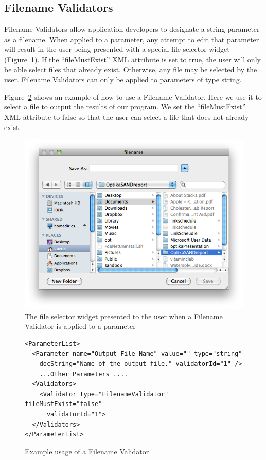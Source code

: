 \subsection{Filename Validators}
Filename Validators allow application developers to designate a string parameter as a filename. When applied to a parameter,
any attempt to edit that parameter will result in the user being presented with a special file selector widget (Figure~\ref{fileSelectorWidget}). If the 
``fileMustExist'' XML attribute is set to true, the user will only be able select files that already exist. Otherwise, any file may be selected by the user.
Filename Validators can only be applied to parameters of type string. 

Figure~\ref{filenameValidatorXML} shows an example of how to use a Filename Validator. Here we use it to select a file to output the results
of our program. We set the ``fileMustExist'' XML attribute to false so that the user can select a file that does not already exist.
\begin{figure}
\centering
\includegraphics[scale=0.5]{graphics/fileWidget}
\caption{The file selector widget presented to the user when a Filename Validator is applied to a parameter}
\label{fileSelectorWidget}
\end{figure}

\begin{figure}
\centering
{\footnotesize
\begin{Verbatim}
<ParameterList>
  <Parameter name="Output File Name" value="" type="string" 
    docString="Name of the output file." validatorId="1" />
    ...Other Parameters ....
  <Validators>
    <Validator type="FilenameValidator" fileMustExist="false" 
      validatorId="1">
  </Validators>
</ParameterList>
\end{Verbatim}
}
\caption{Example usage of a Filename Validator}
\label{filenameValidatorXML}
\end{figure}

